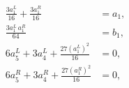 \begin{equation}\begin{split}
\frac{3a_1^L}{16}+\frac{3a_1^R}{16}&=a_1,\\
\frac{3a_1^L\, a_1^R}{64} &= b_1,\\
6a_5^L+3a_4^L+\frac{27(a_1^L)^2}{16} &= 0,\\
6a_5^R+3a_4^R+\frac{27(a_1^R)^2}{16} &= 0,
\end{split}\end{equation}

